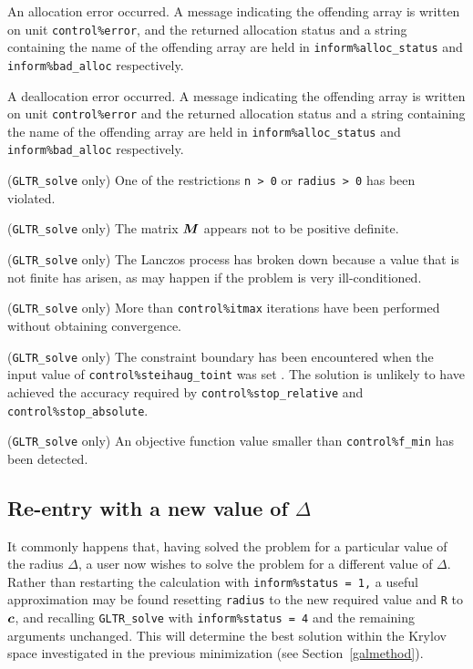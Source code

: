 \documentclass{galahad}
\newcommand{\packagename}{GL\-TR}
\begin{document}
\begin{description}
 An allocation error occurred. A message indicating
the offending
array is written on unit {\tt control\%error}, and the returned allocation
status and a string containing the name of the offending array
are held in {\tt inform\%alloc\_\-status}
and {\tt inform\%bad\_alloc} respectively.

 A deallocation error occurred.
A message indicating the offending
array is written on unit {\tt control\%error} and the returned allocation
status and a string containing the name of the offending array
are held in {\tt inform\%alloc\_\-status}
and {\tt inform\%bad\_alloc} respectively.

 ({\tt \packagename\_solve} only)
One of the restrictions
{\tt n > 0}
or
{\tt radius > 0}
has been violated.

 ({\tt \packagename\_solve} only)
The matrix ${\bm{M}}$ appears not to be positive definite.

 ({\tt \packagename\_solve} only)
The Lanczos process has broken down because a value that is not finite
has arisen, as may happen if the problem is very ill-conditioned.

 ({\tt \packagename\_solve} only) More than
{\tt control\%itmax} iterations have been performed without obtaining
convergence.

 ({\tt \packagename\_solve} only)
The constraint boundary has been
encountered when the input value of {\tt control\%steihaug\-\_\-toint} was
set \true. The
solution is unlikely to have achieved the accuracy required by
{\tt control\%stop\_rela\-tive} and {\tt control\%stop\_absolute}.

\itt{\galerrfmin} ({\tt \packagename\_solve} only)
An objective function value smaller than {\tt control\%f\_min} has
been detected.

\end{description}


\subsection{Re-entry with a new value of $\Delta$}
It commonly happens that, having solved the problem for a particular value
of the radius $\Delta$, a user now wishes to solve the problem for a different
value of $\Delta$. Rather than restarting the calculation with
{\tt inform\%status = 1,} a useful approximation may be found
resetting {\tt radius} to the new required value and {\tt R} to ${\bm{c}}$,
and recalling {\tt \packagename\_solve}
with {\tt inform\%status = 4} and the remaining arguments unchanged.
This will determine the best solution within the Krylov space investigated
in the previous minimization (see Section~\ref{galmethod}).
\end{document}
